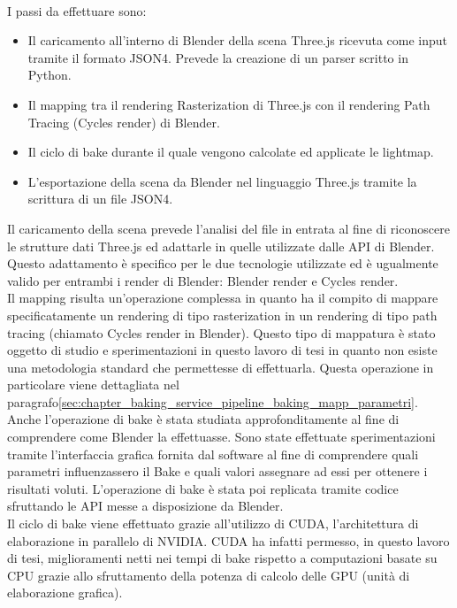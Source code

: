 \\
I passi da effettuare sono:
\begin{itemize}
\item Il caricamento all’interno di Blender della scena Three.js ricevuta come input tramite il formato JSON4. Prevede la creazione di un parser scritto in Python.
\item Il mapping tra il rendering Rasterization di Three.js con il rendering Path Tracing (Cycles render) di Blender.
\item Il ciclo di bake durante il quale vengono calcolate ed applicate le lightmap.
\item L’esportazione della scena da Blender nel linguaggio Three.js tramite la scrittura di un file JSON4.
\end{itemize}

Il caricamento della scena prevede l’analisi del file in entrata al fine di riconoscere le strutture dati Three.js ed adattarle in quelle utilizzate dalle API di Blender.
Questo adattamento è specifico per le due tecnologie utilizzate ed è ugualmente valido per entrambi i render di Blender: Blender render e Cycles render.
\\
Il mapping risulta un’operazione complessa in quanto ha il compito di mappare specificatamente un rendering di tipo rasterization in un rendering di tipo path tracing (chiamato Cycles render in Blender).
Questo tipo di mappatura è stato oggetto di studio e sperimentazioni in questo lavoro di tesi in quanto non esiste una metodologia standard che permettesse di effettuarla. Questa operazione in particolare viene dettagliata nel paragrafo\ref{sec:chapter_baking_service_pipeline_baking_mapp_parametri}.
\\
Anche l’operazione di bake è stata studiata approfonditamente al fine di comprendere come Blender la effettuasse. Sono state effettuate sperimentazioni tramite l’interfaccia grafica fornita dal software al fine di comprendere quali parametri influenzassero il Bake e quali valori assegnare ad essi per ottenere i risultati voluti. L’operazione di bake è stata poi replicata tramite codice sfruttando le API messe a disposizione da Blender.
\\
Il ciclo di bake viene effettuato grazie all’utilizzo di CUDA, l'architettura di elaborazione in parallelo di NVIDIA. 
CUDA ha infatti permesso, in questo lavoro di tesi, miglioramenti netti nei tempi di bake rispetto a computazioni basate su CPU grazie allo sfruttamento della potenza di calcolo delle GPU (unità di elaborazione grafica).
\\
